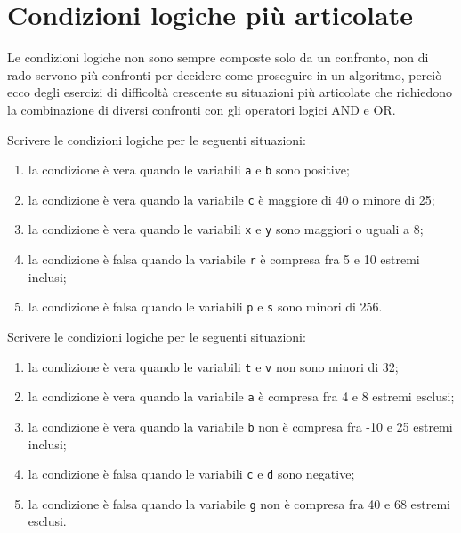 \section{Condizioni logiche più articolate}

Le condizioni logiche non sono sempre composte solo da un confronto, non di rado servono più confronti per decidere come proseguire in un algoritmo, perciò ecco degli esercizi di difficoltà crescente su situazioni più articolate che richiedono la combinazione di diversi confronti con gli operatori logici AND e OR.

\begin{exercise}
	Scrivere le condizioni logiche per le seguenti situazioni:
	\begin{enumerate}
		\item la condizione è vera quando le variabili \texttt{a} e \texttt{b} sono positive;
		\item la condizione è vera quando la variabile \texttt{c} è maggiore di 40 o minore di 25;
		\item la condizione è vera quando le variabili \texttt{x} e \texttt{y} sono maggiori o uguali a 8;
		\item la condizione è falsa quando la variabile \texttt{r} è compresa fra 5 e 10 estremi inclusi;
		\item la condizione è falsa quando le variabili \texttt{p} e \texttt{s} sono minori di 256.
	\end{enumerate}
\end{exercise}

\begin{exercise}
	Scrivere le condizioni logiche per le seguenti situazioni:
	\begin{enumerate}
		\item la condizione è vera quando le variabili \texttt{t} e \texttt{v} non sono minori di 32;
		\item la condizione è vera quando la variabile \texttt{a} è compresa fra 4 e 8 estremi esclusi;
		\item la condizione è vera quando la variabile \texttt{b} non è compresa fra -10 e 25 estremi inclusi;
		\item la condizione è falsa quando le variabili \texttt{c} e \texttt{d} sono negative;
		\item la condizione è falsa quando la variabile \texttt{g} non è compresa fra 40 e 68 estremi esclusi.
	\end{enumerate}
\end{exercise}

